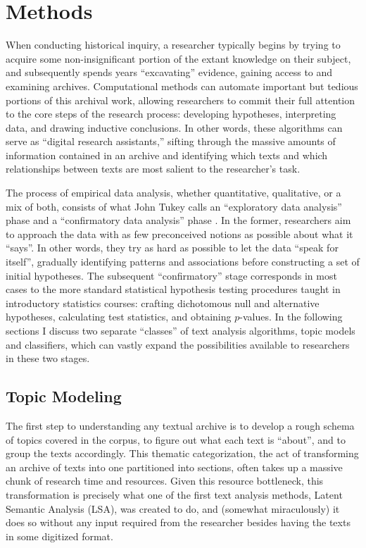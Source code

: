 \section{Methods}

When conducting historical inquiry, a researcher typically begins by trying to acquire some non-insignificant portion of the extant knowledge on their subject, and subsequently spends years ``excavating'' evidence, gaining access to and examining archives. Computational methods can automate important but tedious portions of this archival work, allowing researchers to commit their full attention to the core steps of the research process: developing hypotheses, interpreting data, and drawing inductive conclusions. In other words, these algorithms can serve as ``digital research assistants,'' sifting through the massive amounts of information contained in an archive and identifying which texts and which relationships between texts are most salient to the researcher's task.

The process of empirical data analysis, whether quantitative, qualitative, or a mix of both, consists of what John Tukey calls an ``exploratory data analysis'' phase and a ``confirmatory data analysis'' phase \citep{tukey_exploratory_1977}. In the former, researchers aim to approach the data with as few preconceived notions as possible about what it ``says''. In other words, they try as hard as possible to let the data ``speak for itself'', gradually identifying patterns and associations before constructing a set of initial hypotheses. The subsequent ``confirmatory'' stage corresponds in most cases to the more standard statistical hypothesis testing procedures taught in introductory statistics courses: crafting dichotomous null and alternative hypotheses, calculating test statistics, and obtaining $p$-values.  In the following sections I discuss two separate ``classes'' of text analysis algorithms, topic models and classifiers, which can vastly expand the possibilities available to researchers in these two stages.

\subsection{Topic Modeling}

The first step to understanding any textual archive is to develop a rough schema of topics covered in the corpus, to figure out what each text is ``about'', and to group the texts accordingly. This thematic categorization, the act of transforming an archive of texts into one partitioned into sections, often takes up a massive chunk of research time and resources. Given this resource bottleneck, this transformation is precisely what one of the first text analysis methods, Latent Semantic Analysis (LSA), was created to do, and (somewhat miraculously) it does so without any input required from the researcher besides having the texts in some digitized format.


